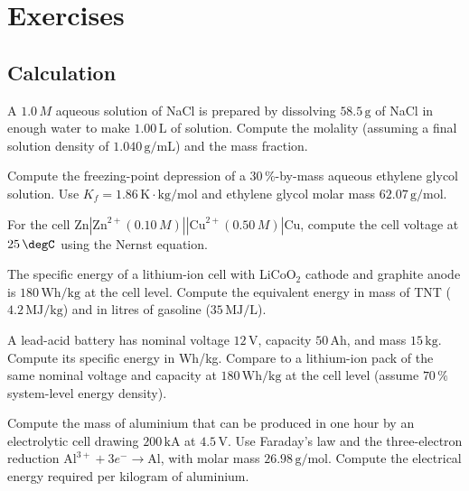 \section{Exercises}

\subsection*{Calculation}

\begin{exercise}
A $1.0\,M$ aqueous solution of NaCl is prepared by dissolving
$58.5\,\text{g}$ of NaCl in enough water to make $1.00\,\text{L}$ of
solution. Compute the molality (assuming a final solution density of
$1.040\,\text{g}/\text{mL}$) and the mass fraction.
\end{exercise}

\begin{exercise}
Compute the freezing-point depression of a $30\,\%$-by-mass aqueous
ethylene glycol solution. Use $K_f = 1.86\,\si{\kelvin}\cdot\text{kg}/
\text{mol}$ and ethylene glycol molar mass $62.07\,\text{g}/\text{mol}$.
\end{exercise}

\begin{exercise}
For the cell $\text{Zn} | \text{Zn}^{2+}(0.10\,M) ||
\text{Cu}^{2+}(0.50\,M) | \text{Cu}$, compute the cell voltage at
$25\,\degC$ using the Nernst equation.
\end{exercise}

\begin{exercise}
The specific energy of a lithium-ion cell with LiCoO$_2$ cathode and
graphite anode is $180\,\text{Wh}/\text{kg}$ at the cell level. Compute
the equivalent energy in mass of TNT ($4.2\,\text{MJ}/\text{kg}$) and
in litres of gasoline ($35\,\text{MJ}/\text{L}$).
\end{exercise}

\begin{exercise}
A lead-acid battery has nominal voltage $12\,\text{V}$, capacity
$50\,\text{Ah}$, and mass $15\,\text{kg}$. Compute its specific energy
in Wh/kg. Compare to a lithium-ion pack of the same nominal voltage
and capacity at $180\,\text{Wh}/\text{kg}$ at the cell level (assume
$70\,\%$ system-level energy density).
\end{exercise}

\begin{exercise}
Compute the mass of aluminium that can be produced in one hour by an
electrolytic cell drawing $200\,\text{kA}$ at $4.5\,\text{V}$. Use
Faraday's law and the three-electron reduction
$\text{Al}^{3+} + 3 e^- \to \text{Al}$, with molar mass $26.98\,
\text{g}/\text{mol}$. Compute the electrical energy required per
kilogram of aluminium.
\end{exercise}

